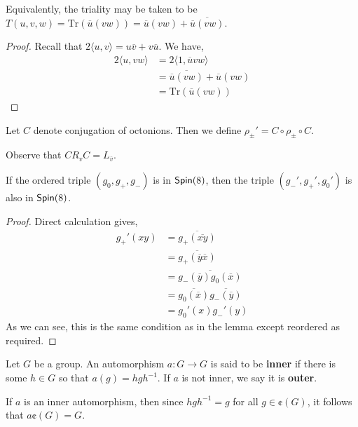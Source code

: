 \begin{cor}
    Equivalently, the triality may be taken to be $T(u,v,w) = \textrm{Tr}(\overline{u}(vw))= \overline{u}(vw)+\overline{\overline{u}(vw)}$.
\end{cor}
\begin{proof}
Recall that $2\langle u,v\rangle = u\overline{v}+v\overline{u}$. We have,
    \begin{align*}
        2\langle u,vw\rangle &= 2\langle 1,\overline{u}vw\rangle \\
        &= \overline{\overline{u}(vw)} + \overline{u}(vw)\\
        &= \textrm{Tr}(\overline{u}(vw))
    \end{align*}
\end{proof}


\begin{defn}
    Let $C$ denote conjugation of octonions. Then we define $\rho_{\pm}' = C\circ \rho_{\pm}\circ C$.
\end{defn}
\begin{remark*}
    Observe that $C R_v C =L_{\overline{v}}$.
\end{remark*}
\begin{lemma}
    If the ordered triple $(g_0,g_+,g_-)$ is in $\operatorname{\textsf{Spin}}(8)$, then the triple $(g_-',g_+',g_0')$ is also in $\operatorname{\textsf{Spin}}(8)$.
\end{lemma}
\begin{proof}
Direct calculation gives,
    \begin{align*}
g_+'(xy)&=\overline{g_+(\overline{xy})}\\&=\overline{g_+(\overline{y}\overline{x})}\\&=\overline{g_-(\overline{y})g_0(\overline{x})}\\
        &=\overline{g_0(\overline{x})}\overline{g_-(\overline{y})}\\&= g_0'(x)g_-'(y)
    \end{align*}
    As we can see, this is the same condition as in the lemma except reordered as required.
\end{proof}
\begin{defn}
Let $G$ be a group. An automorphism $a : G\to G$ is said to be \textbf{inner} if there is some $h\in G$ so that $a(g) = hgh^{-1}$. If $a$ is not inner, we say it is \textbf{outer}.
\end{defn}
\begin{remark*}
    If $a$ is an inner automorphism, then since $hgh^{-1}=g$ for all $g \in \cent(G)$, it follows that $a\cent(G) = G$.
\end{remark*}

